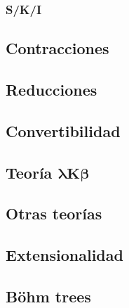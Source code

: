 \subsubsection{S/K/I}

\subsection{Contracciones}

\subsection{Reducciones}

\subsection{Convertibilidad}

\subsection{Teoría \texorpdfstring{\(\boldsymbol{\lambda K \beta}\)}{\lambda K
    \beta}}

\subsection{Otras teorías}

\subsection{Extensionalidad}

\subsection{Böhm trees}

